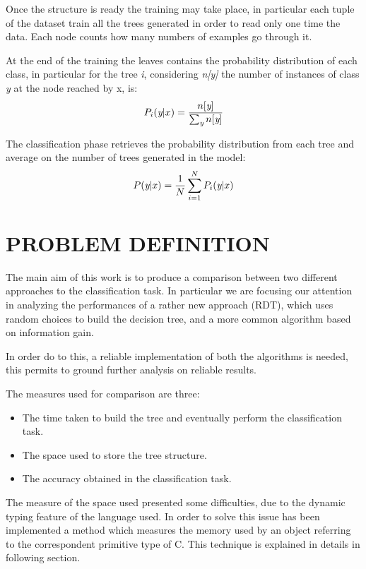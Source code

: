 \documentclass{acm_proc_article-sp-sigmod07}
\begin{document}
Once the structure is ready the training may take place, in
particular each tuple of the dataset train all the trees generated in
order to read only one time the data. Each node counts how many
numbers of examples go through it.

At the end of the training the leaves contains the probability distribution
of each class, in particular for the tree \emph{i}, considering
\emph{n[y]} the number of instances of class \emph{y} at the node reached
by x, is:
\begin{equation}
\label{formula:probability_tree}
	P_i(\emph{y}|x) = \frac{n[\emph{y}]}{\sum_\emph{y} n[\emph{y}]}
\end{equation}

The classification phase retrieves the probability distribution from each
tree and average on the number of trees generated in the model:
\begin{equation}
\label{formula:probability_forest}
	P(\emph{y}|x) = \frac{1}{N} \sum_{i=1}^N P_i(\emph{y}|x)
\end{equation}


\section{PROBLEM DEFINITION}
The main aim of this work is to produce a comparison between two different
approaches to the classification task. In particular we are focusing our
attention in analyzing the performances of a rather new approach (RDT),
which uses random choices to build the decision tree, and a more common
algorithm based on information gain.

In order do to this, a reliable implementation of both the algorithms is
needed, this permits to ground further analysis on reliable results.

The measures used for comparison are three:
\begin{itemize}
\item The time taken to build the tree and eventually perform the
classification task.
\item The space used to store the tree structure.
\item The accuracy obtained in the classification task.
\end{itemize}

The measure of the space used presented some difficulties, due to the
dynamic typing feature of the language used. In order to solve this issue
has been implemented a method which measures the memory used by an object
referring to the correspondent primitive type of C. This technique is
explained in details in following section.
\end{document}
